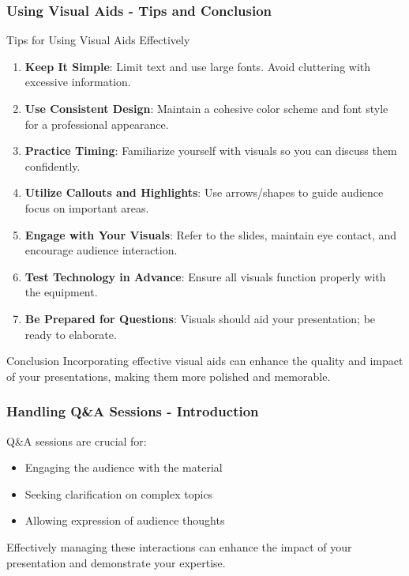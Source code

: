 \documentclass[aspectratio=169]{beamer}
\begin{document}
\begin{frame}[fragile]
    \frametitle{Using Visual Aids - Tips and Conclusion}
    \begin{block}{Tips for Using Visual Aids Effectively}
        \begin{enumerate}
            \item \textbf{Keep It Simple}: Limit text and use large fonts. Avoid cluttering with excessive information.
            \item \textbf{Use Consistent Design}: Maintain a cohesive color scheme and font style for a professional appearance.
            \item \textbf{Practice Timing}: Familiarize yourself with visuals so you can discuss them confidently.
            \item \textbf{Utilize Callouts and Highlights}: Use arrows/shapes to guide audience focus on important areas.
            \item \textbf{Engage with Your Visuals}: Refer to the slides, maintain eye contact, and encourage audience interaction.
            \item \textbf{Test Technology in Advance}: Ensure all visuals function properly with the equipment.
            \item \textbf{Be Prepared for Questions}: Visuals should aid your presentation; be ready to elaborate.
        \end{enumerate}
    \end{block}
    
    \begin{block}{Conclusion}
        Incorporating effective visual aids can enhance the quality and impact of your presentations, making them more polished and memorable.
    \end{block}
\end{frame}

\begin{frame}[fragile]
    \frametitle{Handling Q\&A Sessions - Introduction}
    Q\&A sessions are crucial for:
    \begin{itemize}
        \item Engaging the audience with the material
        \item Seeking clarification on complex topics
        \item Allowing expression of audience thoughts
    \end{itemize}
    Effectively managing these interactions can enhance the impact of your presentation and demonstrate your expertise.
\end{frame}
\end{document}
